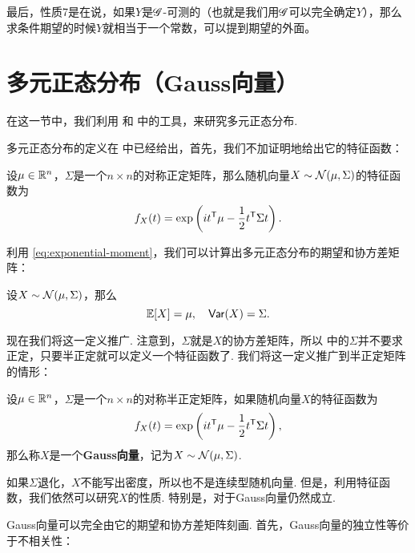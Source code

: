 最后，性质7是在说，如果$Y$是$\mathscr{G}$-可测的（也就是我们用$\mathscr{G}$可以完全确定$Y$），那么求条件期望的时候$Y$就相当于一个常数，可以提到期望的外面。

\section{多元正态分布（Gauss向量）}\label{sec:multivariate-normal}

在这一节中，我们利用 和 中的工具，来研究多元正态分布.

多元正态分布的定义在 中已经给出，首先，我们不加证明地给出它的特征函数：

\begin{theorem}\label{thm:multivariate-normal-characteristic-function}
设$\mu\in\mathbb{R}^n$，$\Sigma$是一个$n\times n$的对称正定矩阵，那么随机向量$X\sim\mathcal{N}(\mu,\Sigma)$的特征函数为
\[f_X(t)=\exp\left(it^{\mathsf{T}}\mu-\frac{1}{2}t^{\mathsf{T}}\Sigma t\right).\]
\end{theorem}

利用 \eqref{eq:exponential-moment}，我们可以计算出多元正态分布的期望和协方差矩阵：

\begin{proposition}\label{prop:multivariate-normal-expectation-covariance}
设$X\sim\mathcal{N}(\mu,\Sigma)$，那么
\[\mathbb{E}[X]=\mu,\quad\mathsf{Var}(X)=\Sigma.\]
\end{proposition}

现在我们将这一定义推广. 注意到，$\Sigma$就是$X$的协方差矩阵，所以 中的$\Sigma$并不要求正定，只要半正定就可以定义一个特征函数了. 我们将这一定义推广到半正定矩阵的情形：

\begin{definition}[Gauss向量]\label{def:gauss-vector}
设$\mu\in\mathbb{R}^n$，$\Sigma$是一个$n\times n$的对称半正定矩阵，如果随机向量$X$的特征函数为
\[f_X(t)=\exp\left(it^{\mathsf{T}}\mu-\frac{1}{2}t^{\mathsf{T}}\Sigma t\right),\]
那么称$X$是一个\textbf{Gauss向量}，记为$X\sim\mathcal{N}(\mu,\Sigma)$.
\end{definition}

如果$\Sigma$退化，$X$不能写出密度，所以也不是连续型随机向量. 但是，利用特征函数，我们依然可以研究$X$的性质. 特别是，对于Gauss向量仍然成立. 

Gauss向量可以完全由它的期望和协方差矩阵刻画. 首先，Gauss向量的独立性等价于不相关性：

